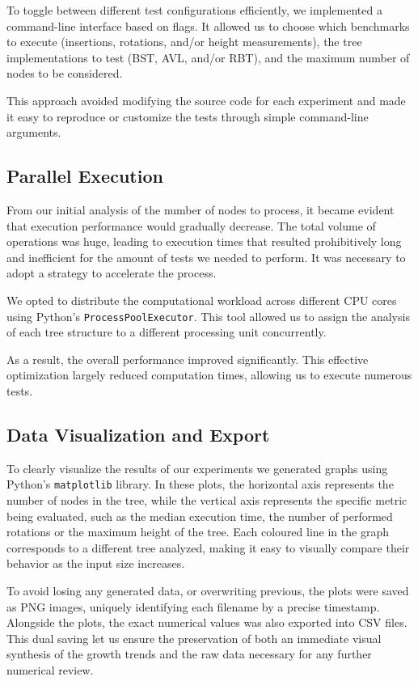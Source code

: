 \documentclass[12pt,a4paper]{article}
\begin{document}
            To toggle between different test configurations efficiently, we implemented a command-line interface based on flags. It allowed us to choose which benchmarks to execute (insertions, rotations, and/or height measurements), the tree implementations to test (BST, AVL, and/or RBT), and the maximum number of nodes to be considered.
            
            This approach avoided modifying the source code for each experiment and made it easy to reproduce or customize the tests through simple command-line arguments.

        \subsection{Parallel Execution}

        From our initial analysis of the number of nodes to process, it became evident that execution performance would gradually decrease. The total volume of operations was huge, leading to execution times that resulted prohibitively long and inefficient for the amount of tests we needed to perform. It was necessary to adopt a strategy to accelerate the process.

        We opted to distribute the computational workload across different CPU cores using Python's \texttt{ProcessPoolExecutor}. This tool allowed us to assign the analysis of each tree structure to a different processing unit concurrently.

            As a result, the overall performance improved significantly. This effective optimization largely reduced computation times, allowing us to execute numerous tests.

        \subsection{Data Visualization and Export}

            To clearly visualize the results of our experiments we generated graphs using Python's \texttt{matplotlib} library. In these plots, the horizontal axis represents the number of nodes in the tree, while the vertical axis represents the specific metric being evaluated, such as the median execution time, the number of performed rotations or the maximum height of the tree. Each coloured line in the graph corresponds to a different tree analyzed, making it easy to visually compare their behavior as the input size increases.

            To avoid losing any generated data, or overwriting previous, the plots were saved as PNG images, uniquely identifying each filename by a precise timestamp. Alongside the plots, the exact numerical values was also exported into CSV files. This dual saving let us ensure the preservation of both an immediate visual synthesis of the growth trends and the raw data necessary for any further numerical review.
\end{document}
